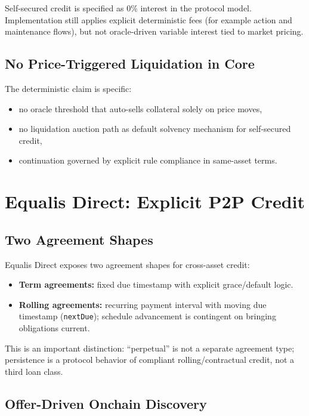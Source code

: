 \documentclass[version=preprint]{iacrcc}
\begin{document}
Self-secured credit is specified as 0\% interest in the protocol model. Implementation still applies explicit deterministic fees (for example action and maintenance flows), but not oracle-driven variable interest tied to market pricing.

\subsection{No Price-Triggered Liquidation in Core}

The deterministic claim is specific:
\begin{itemize}
  \item no oracle threshold that auto-sells collateral solely on price moves,
  \item no liquidation auction path as default solvency mechanism for self-secured credit,
  \item continuation governed by explicit rule compliance in same-asset terms.
\end{itemize}

\section{Equalis Direct: Explicit P2P Credit}

\subsection{Two Agreement Shapes}

Equalis Direct exposes two agreement shapes for cross-asset credit:
\begin{itemize}
  \item \textbf{Term agreements:} fixed due timestamp with explicit grace/default logic.
  \item \textbf{Rolling agreements:} recurring payment interval with moving due timestamp (\texttt{nextDue}); schedule advancement is contingent on bringing obligations current.
\end{itemize}

This is an important distinction: ``perpetual'' is not a separate agreement type; persistence is a protocol behavior of compliant rolling/contractual credit, not a third loan class.

\subsection{Offer-Driven Onchain Discovery}
\end{document}
